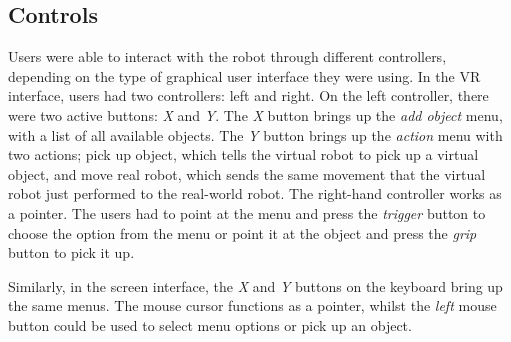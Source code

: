 \documentclass[letterpaper, 10 pt, conference]{ieeeconf}  %
\begin{document}

\subsection{Controls}
\label{subsec:control}


Users were able to interact with the robot through different controllers, depending on the type of graphical user interface they were using. In the VR interface, users had two controllers: left and right. On the left controller, there were two active buttons: \textit{X} and \textit{Y}. The \textit{X} button brings up the \textit{add object} menu, with a list of all available objects. The \textit{Y} button brings up the \textit{action} menu with two actions; pick up object, which  tells the virtual robot to pick up a virtual object, and move real robot, which sends the same movement that the virtual robot just performed to the real-world robot. The right-hand controller works as a pointer. The users had to point at the menu and press the \textit{trigger} button to choose the option from the menu or point it at the object and press the \textit{grip} button to pick it up.

Similarly, in the screen interface, the \textit{X} and \textit{Y} buttons on the keyboard  bring up the same menus. The mouse cursor functions as a pointer, whilst the \textit{left} mouse button could be used to select menu options or pick up an object. 
\end{document}
